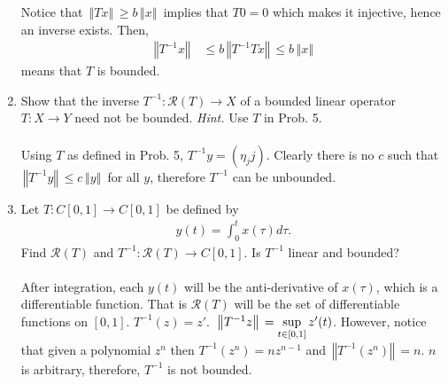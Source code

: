 \documentclass[10pt,a4paper]{report}
\newcommand{\NORM}[1]{\,\left \Vert #1 \right \Vert\,}
\begin{document}
\begin{enumerate}
	Notice that $\NORM{Tx} \ge b\NORM{x}$ implies that $T0 = 0$ which makes it injective, hence an inverse exists.  Then,
	\begin{align*}
		\NORM{T^{-1}x} &\le b\NORM{T^{-1}Tx} \le b\NORM{x}
	\end{align*}means that $T$ is bounded.
	\newpage
	\item Show that the inverse $T^{-1}:\mathcal{R}(T)\to X$ of a bounded linear operator $T:X\to Y$ need not be bounded.  \textit{Hint.}  Use $T$ in Prob. 5.\\
	\\
	Using $T$ as defined in Prob. 5, $T^{-1}y = (\eta_j j)$.  Clearly there is no $c$ such that $\NORM{T^{-1}y} \le c\NORM{y}$ for all $y$, therefore $T^{-1}$ can be unbounded.
	\\
	\item Let $T: C[0,1] \to C[0,1]$ be defined by 
	\begin{align*}
		y(t) = \int_0^t x(\tau) d\tau.
	\end{align*}Find $\mathcal{R}(T)$ and $T^{-1}:\mathcal{R}(T)\to C[0,1]$.  Is $T^{-1}$ linear and bounded?\\
	\\
	After integration, each $y(t)$ will be the anti-derivative of $x(\tau)$, which is a differentiable function.  That is $\mathcal{R}(T)$ will be the set of differentiable functions on $[0,1]$.  $T^{-1}(z) = z'$.  $\NORM{T^{-1}z} =\SUP{t\in[0,1]} z'(t)$.  However, notice that given a polynomial $z^n$ then $T^{-1}(z^n)= nz^{n-1}$ and $\NORM{T^{-1}(z^n)} = n$.  $n$ is arbitrary, therefore, $T^{-1}$ is not bounded.
\end{enumerate}
\newpage 
\end{document}
